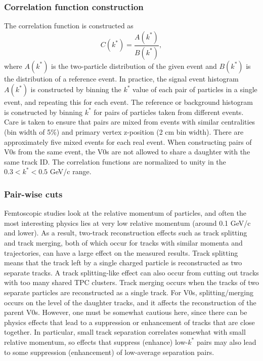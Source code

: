 \subsubsection{Correlation function construction}
\label{sec:CFconstruct}

The correlation function is constructed as
\begin{equation}
\label{eq:CFDefinition}
C(k^*) = \frac{A(k^*)}{B(k^*)},
\end{equation}
where $A(k^*)$ is the two-particle distribution of the given event and $B(k^*)$ is the distribution of a reference event.  
In practice, the signal event histogram $A(k^*)$ is constructed by binning the $k^*$ value of each pair of particles in a single event, and repeating this for each event.  
The reference or background histogram is constructed by binning $k^*$ for pairs of particles taken from different events.  
Care is taken to ensure that pairs are mixed from events with similar centralities (bin width of 5\%) and primary vertex z-position (2 cm bin width).  
There are approximately five mixed events for each real event.  
When constructing pairs of V0s from the same event, the V0s are not allowed to share a daughter with the same track ID. 
The correlation functions are normalized to unity in the $ 0.3 < k^* < 0.5$ GeV/c range.

\subsubsection{Pair-wise cuts}
\label{sec:PairWiseCuts}

Femtoscopic studies look at the relative momentum of particles, and often the most interesting physics lies at very low relative momentum (around 0.1 GeV/c and lower).  
As a result, two-track reconstruction effects such as track splitting and track merging, both of which occur for tracks with similar momenta and trajectories, can have a large effect on the measured results.  
Track splitting means that the track left by a single charged particle is reconstructed as two separate tracks. 
A track splitting-like effect can also occur from cutting out tracks with too many shared TPC clusters.
Track merging occurs when the tracks of two separate particles are reconstructed as a single track.  
For V0s, splitting/merging occurs on the level of the daughter tracks, and it affects the reconstruction of the parent V0s.
However, one must be somewhat cautious here, since there can be physics effects that lead to a suppression or enhancement of tracks that are close together.
In particular, small track separation correlates somewhat with small relative momentum, so effects that suppress (enhance) low-$k^*$ pairs may also lead to some suppression (enhancement) of low-average separation pairs.  

